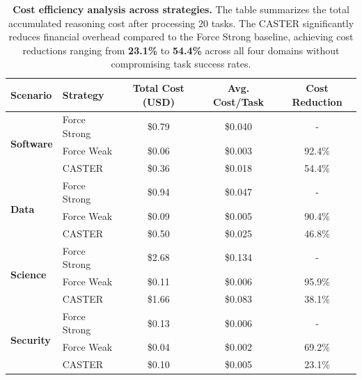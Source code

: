 \documentclass{article}
\theoremstyle{plain}
\theoremstyle{definition}
\theoremstyle{remark}
\begin{document}
\begin{table}[t]
    \centering
    \caption{\textbf{Cost efficiency analysis across strategies.} The table summarizes the total accumulated reasoning cost after processing 20 tasks. The CASTER significantly reduces financial overhead compared to the Force Strong baseline, achieving cost reductions ranging from \textbf{23.1\%} to \textbf{54.4\%} across all four domains without compromising task success rates.}
    \label{tab:cost_efficiency}
    \begin{tabular}{llccc}
        \toprule
        \textbf{Scenario} & \textbf{Strategy} & \textbf{Total Cost (USD)} & \textbf{Avg. Cost/Task} & \textbf{Cost Reduction} \\
        \midrule
        \multirow{3}{*}{\textbf{Software}} 
        & Force Strong & \$0.79 & \$0.040 & - \\ %
        & Force Weak   & \$0.06 & \$0.003 & 92.4\% \\ %
        & CASTER& \$0.36 & \$0.018 & 54.4\% \\ %
        \midrule
        \multirow{3}{*}{\textbf{Data}} 
        & Force Strong & \$0.94 & \$0.047 & - \\ 
        & Force Weak   & \$0.09 & \$0.005 & 90.4\% \\
        & CASTER& \$0.50 & \$0.025 & 46.8\% \\ 
        \midrule
        \multirow{3}{*}{\textbf{Science}} 
        & Force Strong & \$2.68 & \$0.134 & - \\ 
        & Force Weak   & \$0.11 & \$0.006 & 95.9\% \\
        & CASTER& \$1.66 & \$0.083 & 38.1\% \\ 
        \midrule
        \multirow{3}{*}{\textbf{Security}} 
        & Force Strong & \$0.13 & \$0.006 & - \\ 
        & Force Weak   & \$0.04 & \$0.002 & 69.2\% \\
        & CASTER& \$0.10 & \$0.005 & 23.1\% \\ 
        \bottomrule
    \end{tabular}
\end{table}
\end{document}
